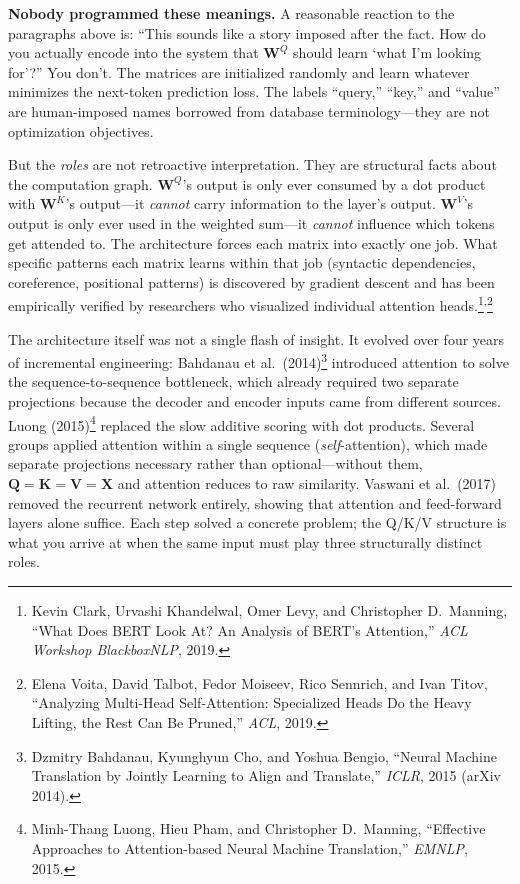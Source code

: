 \begin{notebox}
\textbf{Nobody programmed these meanings.} A reasonable reaction to the paragraphs above is: ``This sounds like a story imposed after the fact. How do you actually encode into the system that $\mathbf{W}^Q$ should learn `what I'm looking for'?''
You don't. The matrices are initialized randomly and learn whatever minimizes the next-token prediction loss. The labels ``query,'' ``key,'' and ``value'' are human-imposed names borrowed from database terminology---they are not optimization objectives.

But the \emph{roles} are not retroactive interpretation. They are structural facts about the computation graph. $\mathbf{W}^Q$'s output is only ever consumed by a dot product with $\mathbf{W}^K$'s output---it \emph{cannot} carry information to the layer's output. $\mathbf{W}^V$'s output is only ever used in the weighted sum---it \emph{cannot} influence which tokens get attended to. The architecture forces each matrix into exactly one job. What specific patterns each matrix learns within that job (syntactic dependencies, coreference, positional patterns) is discovered by gradient descent and has been empirically verified by researchers who visualized individual attention heads.\footnote{Kevin Clark, Urvashi Khandelwal, Omer Levy, and Christopher D.\ Manning, ``What Does BERT Look At? An Analysis of BERT's Attention,'' \emph{ACL Workshop BlackboxNLP}, 2019.}\textsuperscript{,}\footnote{Elena Voita, David Talbot, Fedor Moiseev, Rico Sennrich, and Ivan Titov, ``Analyzing Multi-Head Self-Attention: Specialized Heads Do the Heavy Lifting, the Rest Can Be Pruned,'' \emph{ACL}, 2019.}

The architecture itself was not a single flash of insight. It evolved over four years of incremental engineering: Bahdanau et al.\ (2014)\footnote{Dzmitry Bahdanau, Kyunghyun Cho, and Yoshua Bengio, ``Neural Machine Translation by Jointly Learning to Align and Translate,'' \emph{ICLR}, 2015 (arXiv 2014).} introduced attention to solve the sequence-to-sequence bottleneck, which already required two separate projections because the decoder and encoder inputs came from different sources. Luong (2015)\footnote{Minh-Thang Luong, Hieu Pham, and Christopher D.\ Manning, ``Effective Approaches to Attention-based Neural Machine Translation,'' \emph{EMNLP}, 2015.} replaced the slow additive scoring with dot products. Several groups applied attention within a single sequence (\emph{self}-attention), which made separate projections necessary rather than optional---without them, $\mathbf{Q} = \mathbf{K} = \mathbf{V} = \mathbf{X}$ and attention reduces to raw similarity. Vaswani et al.\ (2017) removed the recurrent network entirely, showing that attention and feed-forward layers alone suffice. Each step solved a concrete problem; the Q/K/V structure is what you arrive at when the same input must play three structurally distinct roles.
\end{notebox}

